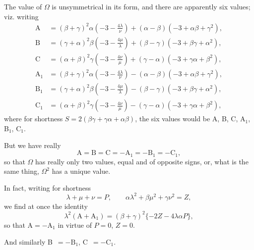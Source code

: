 \documentclass[11pt,a4paper]{book}
\begin{document}
\newpage
\setcounter{page}{110}

The value of $\Omega$ is unsymmetrical in its form, and there are apparently six values; viz. writing
\begin{align*}
\text{A} &= (\beta + \gamma)^{2}\alpha(-3 - \tfrac{4\lambda}{\nu}) + (\alpha - \beta)(-3 + \alpha\beta + \gamma^{2}), \\
\text{B} &= (\gamma + \alpha)^{2}\beta(-3 - \tfrac{4\mu}{\lambda}) + (\beta - \gamma)(-3 + \beta\gamma + \alpha^{2}), \\
\text{C} &= (\alpha + \beta)^{2}\gamma(-3 - \tfrac{4\nu}{\mu}) + (\gamma - \alpha)(-3 + \gamma\alpha + \beta^{2}), \\
\text{A}_{1} &= (\beta + \gamma)^{2}\alpha(-3 - \tfrac{4\lambda}{\nu}) - (\alpha - \beta)(-3 + \alpha\beta + \gamma^{2}), \\
\text{B}_{1} &= (\gamma + \alpha)^{2}\beta(-3 - \tfrac{4\mu}{\lambda}) - (\beta - \gamma)(-3 + \beta\gamma + \alpha^{2}), \\
\text{C}_{1} &= (\alpha + \beta)^{2}\gamma(-3 - \tfrac{4\nu}{\mu}) - (\gamma - \alpha)(-3 + \gamma\alpha + \beta^{2}),
\end{align*}
where for shortness $S = 2(\beta\gamma + \gamma\alpha + \alpha\beta)$, the six values would be A, B, C, A$_{1}$, B$_{1}$, C$_{1}$.

But we have really
\[
\text{A} = \text{B} = \text{C} = -\text{A}_{1} = -\text{B}_{1} = -\text{C}_{1},
\]
so that $\Omega$ has really only two values, equal and of opposite signs, or, what is the same thing, $\Omega^{2}$ has a unique value.

In fact, writing for shortness
\[
\lambda + \mu + \nu = P, \qquad \alpha\lambda^{2} + \beta\mu^{2} + \gamma\nu^{2} = Z,
\]
we find at once the identity
\[
\lambda^{2}(\text{A} + \text{A}_{1}) = (\beta + \gamma)^{2}\{-2Z - 4\lambda\alpha P\},
\]
so that $\text{A} = -\text{A}_{1}$ in virtue of $P=0$, $Z=0$.

And similarly B~$= -\text{B}_{1}$, C~$= -\text{C}_{1}$.
\end{document}
